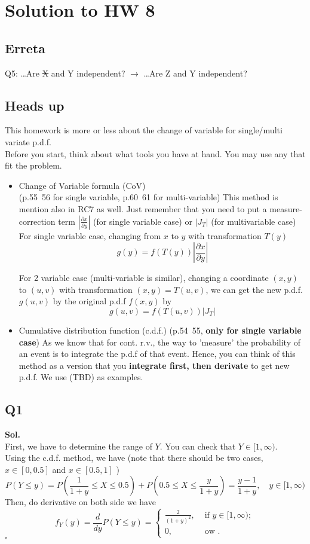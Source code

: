 \documentclass[12pt]{article}
\begin{document}
\section*{Solution to HW 8}
\subsection*{Erreta}
Q5: \dots Are \st{X} and Y independent? \(\to \) \dots Are Z and Y independent?  
\subsection*{Heads up}
This homework is more or less about the change of variable for single/multi variate p.d.f.\\
Before you start, think about what tools you have at hand. You may use any that fit the problem. 
\begin{itemize}
   \item Change of Variable formula (CoV) \\
   (p.55~56 for single variable, p.60~61 for multi-variable) 
   This method is mention also in RC7 as well. Just remember that you need to put a measure-correction term $\left\vert \frac{\partial x}{\partial y} \right\vert $ (for single variable case) or \(\left\vert J_T \right\vert \) (for multivariable case) \\
   For single variable case, changing from $x$ to $y$ with transformation $T(y)$  
   \[
    g(y) = f(T(y)) \left\vert \frac{\partial x}{\partial y} \right\vert 
   \]  
    
   For 2 variable case (multi-variable is similar), changing a coordinate $(x,y)$ to \((u,v)\) with transformation $(x,y) = T(u,v)$, we can get the new p.d.f. $g(u,v)$ by the original p.d.f $f(x,y)$  by 
   \[
    g(u,v) = f(T(u,v)) \left| J_T \right|
   \]
   \item Cumulative distribution function (c.d.f.) 
   (p.54~55, \textbf{only for single variable case})
   As we know that for cont. r.v., the way to 'measure' the probability of an event is to integrate the p.d.f of that event. 
   Hence, you can think of this method as a version that you \textbf{integrate first, then derivate} to get new p.d.f. 
   We use (TBD) as examples.  
\end{itemize}
\subsection*{Q1}
\textbf{Sol.}\\ 
First, we have to determine the range of \(Y\). You can check that \(Y \in [1,\infty )\). \\  
Using the c.d.f. method, we have (note that there should be two cases, \(x \in [0,0.5]\) and \(x \in [0.5,1]\)  )
\[
   P(Y \leq  y) = P(\frac{1}{1+y} \leq X \leq 0.5)+P(0.5\leq X \leq \frac{y}{1+y})  = \frac{y-1}{1+y},\quad  y\in [1,\infty)
\]
Then, do derivative on both side we have
\[
   f_{Y} (y) = \frac{d}{dy}P(Y \leq y) = \begin{cases}
      \frac{2}{(1+y)^{2}}  , &\text{ if } y\in [1,\infty ) ;\\
     0 , &\text{ ow }  .
   \end{cases}
\]
\hspace{\textwidth}\(\square\) 
\end{document}
